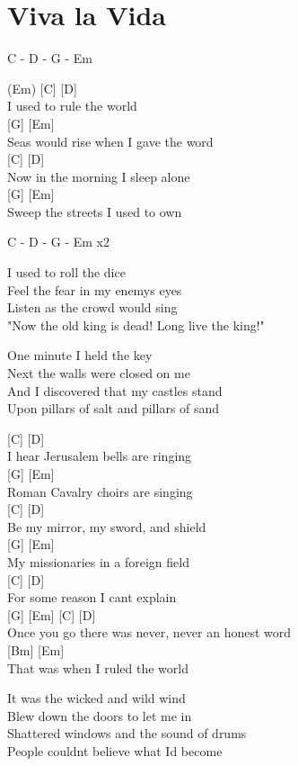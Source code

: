 \documentclass[
  letterpaper,
]{scrbook}
\begin{document}
\hypertarget{viva-la-vida}{%
\chapter{Viva la Vida}\label{viva-la-vida}}

C - D - G - Em

(Em) {[}C{]} {[}D{]}\\
I used to rule the world\\
{[}G{]} {[}Em{]}\\
Seas would rise when I gave the word\\
{[}C{]} {[}D{]}\\
Now in the morning I sleep alone\\
{[}G{]} {[}Em{]}\\
Sweep the streets I used to own

C - D - G - Em x2

I used to roll the dice\\
Feel the fear in my enemy\textquotesingle s eyes\\
Listen as the crowd would sing\\
"Now the old king is dead! Long live the king!"

One minute I held the key\\
Next the walls were closed on me\\
And I discovered that my castles stand\\
Upon pillars of salt and pillars of sand

{[}C{]} {[}D{]}\\
I hear Jerusalem bells are ringing\\
{[}G{]} {[}Em{]}\\
Roman Cavalry choirs are singing\\
{[}C{]} {[}D{]}\\
Be my mirror, my sword, and shield\\
{[}G{]} {[}Em{]}\\
My missionaries in a foreign field\\
{[}C{]} {[}D{]}\\
For some reason I can\textquotesingle t explain\\
{[}G{]} {[}Em{]} {[}C{]} {[}D{]}\\
Once you go there was never, never an honest word\\
{[}Bm{]} {[}Em{]}\\
That was when I ruled the world

It was the wicked and wild wind\\
Blew down the doors to let me in\\
Shattered windows and the sound of drums\\
People couldn\textquotesingle t believe what I\textquotesingle d become
\end{document}
